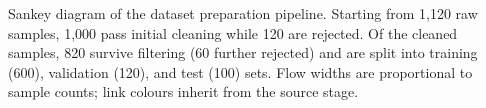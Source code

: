 \caption{Sankey diagram of the dataset preparation pipeline. Starting from 1{,}120 raw samples, 1{,}000 pass initial cleaning while 120 are rejected. Of the cleaned samples, 820 survive filtering (60 further rejected) and are split into training (600), validation (120), and test (100) sets. Flow widths are proportional to sample counts; link colours inherit from the source stage.}
